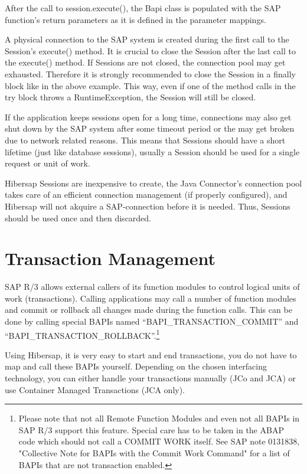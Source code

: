 After the call to session.execute(), the Bapi class is populated with the SAP function's return parameters as it is
defined in the parameter mappings.

A physical connection to the SAP system is created during the first call to the Session's execute() method. 
It is crucial to close the Session after the last call to the execute() method. If Sessions are not
closed, the connection pool may get exhausted. Therefore it is strongly recommended to close the Session in a
finally block like in the above example. This way, even if one of the method calls in the try block throws
a RuntimeException, the Session will still be closed.
 
If the application keeps sessions open for a long time, connections may also get shut down 
by the SAP system after some timeout period or the may get broken due to network related reasons. 
This means that Sessions should have a short lifetime (just like database sessions), usually a Session should 
be used for a single request or unit of work.  

Hibersap Sessions are inexpensive to create, the Java Connector's connection pool takes care of 
an efficient connection management (if properly configured), and Hibersap will not akquire a 
SAP-connection before it is needed. Thus, Sessions should be used once and then discarded.  

\section{Transaction Management} 

SAP R/3 allows external callers of its function modules to control logical units of work (transactions). 
Calling applications may call a number of function modules and commit or rollback all changes made during
the function calls. This can be done by calling special BAPIs named ``BAPI\_TRANSACTION\_COMMIT'' and 
``BAPI\_TRANSACTION\_ROLLBACK''.\footnote{Please note that not all Remote Function Modules and even not 
all BAPIs in SAP R/3 support this feature. Special care has to be taken in the ABAP code which should not
call a COMMIT WORK itself. See SAP note 0131838, "Collective Note for BAPIs with the Commit Work Command"
for a list of BAPIs that are not transaction enabled.}

Using Hibersap, it is very easy to start and end transactions, you do not have to map and call these BAPIs yourself. Depending on the chosen interfacing technology, you can either handle your transactions manually (JCo and JCA) or use Container Managed Transactions (JCA only).

